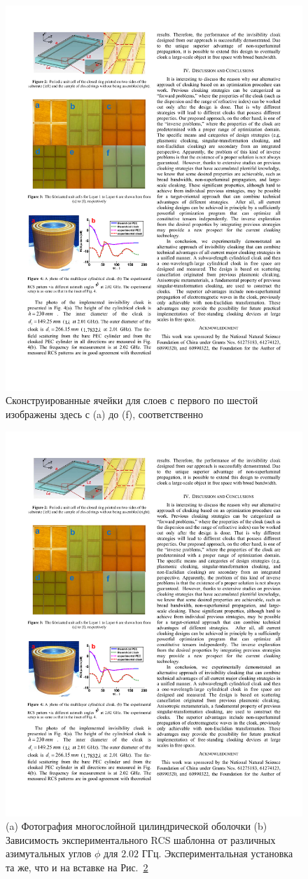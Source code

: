 \documentclass[a4paper, 12pt]{article}
\begin{document}
\begin{figure}
\begin{centering}
\includegraphics[width=0.5\columnwidth,draft=false]{Fig_3}
\caption{\label{fig:fabricated} Сконструированные ячейки для слоев с первого
по шестой изображены здесь с (a) до (f), соответственно}
\end{centering}
\end{figure}

\begin{figure}
\begin{centering}
\includegraphics[width=0.7\columnwidth,draft=false]{Fig_4}
\caption{\label{fig:cloak} (a) Фотография многослойной цилиндрической оболочки
(b) Зависимость экспериментального RCS шаблонна от различных азимутальных
углов $\phi$ для $2.02$ ГГц. Экспериментальная установка та же, что и на
вставке на Рис.~\ref{fig:cloak}}
\end{centering}
\end{figure}
\end{document}

